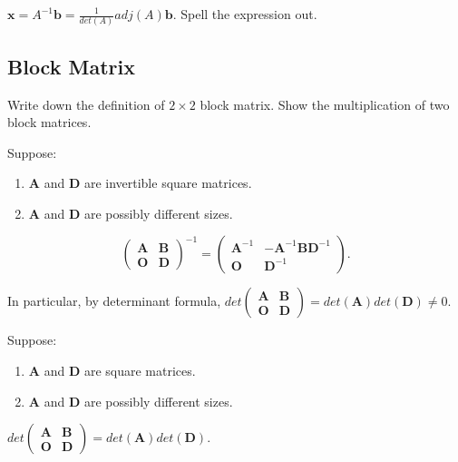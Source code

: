 \documentclass[12pt]{article}
\begin{document}
\begin{pfbox}
    $\mathbf{x}=A^{-1}\mathbf{b}=\frac{1}{det(A)}adj(A)\mathbf{b}$. Spell the expression out.
\end{pfbox}


\subsection*{Block Matrix}
\begin{exercise}
    Write down the definition of $2\times 2$ block matrix.
    Show the multiplication of two block matrices.
\end{exercise}

\begin{theorem}
    Suppose:
    \begin{enumerate}
        \item $\textbf{A}$ and $\textbf{D}$ are invertible square matrices.
        \item $\textbf{A}$ and $\textbf{D}$ are possibly different sizes.
    \end{enumerate}
\[
\begin{pmatrix}
\mathbf{A} & \mathbf{B}\\
\mathbf{O} & \mathbf{D}
\end{pmatrix}^{-1}
=
\begin{pmatrix}
\mathbf{A}^{-1} & -\mathbf{A}^{-1}\mathbf{B}\mathbf{D}^{-1}\\
\mathbf{O} & \mathbf{D}^{-1}
\end{pmatrix}.
\]

In particular, by determinant formula, 
$det\begin{pmatrix}
\mathbf{A} & \mathbf{B}\\
\mathbf{O} & \mathbf{D}
\end{pmatrix} = det(\mathbf{A})det(\mathbf{D})\neq 0. $
\end{theorem}

\begin{theorem}
    Suppose:
    \begin{enumerate}
        \item $\textbf{A}$ and $\textbf{D}$ are square matrices.
        \item $\textbf{A}$ and $\textbf{D}$ are possibly different sizes.
    \end{enumerate}

$det\begin{pmatrix}
\mathbf{A} & \mathbf{B}\\
\mathbf{O} & \mathbf{D}
\end{pmatrix} = det(\mathbf{A})det(\mathbf{D})$.

\end{theorem}
\end{document}
